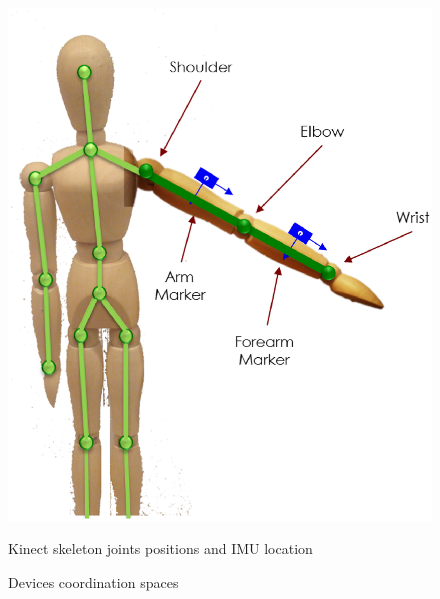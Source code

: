 \documentclass[9pt]{llncs}
\begin{document}
\begin{figure}[!htb]
	\begin{minipage}[b]{0.45\linewidth}
		\centering 
		
		\includegraphics[width=\textwidth]{Fig06.eps}
		\caption{Kinect skeleton joints positions and IMU location}
		\label{fig:skeleton}
	\end{minipage}
	\begin{minipage}[b]{0.45\linewidth}
		\centering 
		\caption{Devices coordination spaces}
		\label{fig:coordinationSpaces}
	\end{minipage}
\end{figure}
\end{document}
